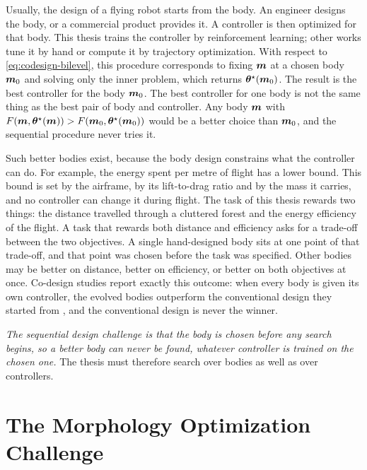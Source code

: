 Usually, the design of a flying robot starts from the body. An engineer designs the body, or a commercial product provides it. A controller is then optimized for that body. This thesis trains the controller by reinforcement learning; other works tune it by hand or compute it by trajectory optimization. With respect to \eqref{eq:codesign-bilevel}, this procedure corresponds to fixing $\bm{m}$ at a chosen body $\bm{m}_0$ and solving only the inner problem, which returns $\bm{\theta}^{\star}(\bm{m}_0)$. The result is the best controller for the body $\bm{m}_0$. The best controller for one body is not the same thing as the best pair of body and controller. Any body $\bm{m}$ with $F(\bm{m}, \bm{\theta}^{\star}(\bm{m})) > F(\bm{m}_0, \bm{\theta}^{\star}(\bm{m}_0))$ would be a better choice than $\bm{m}_0$, and the sequential procedure never tries it.

Such better bodies exist, because the body design constrains what the controller can do. For example, the energy spent per metre of flight has a lower bound. This bound is set by the airframe, by its lift-to-drag ratio and by the mass it carries, and no controller can change it during flight. The task of this thesis rewards two things: the distance travelled through a cluttered forest and the energy efficiency of the flight. A task that rewards both distance and efficiency asks for a trade-off between the two objectives. A single hand-designed body sits at one point of that trade-off, and that point was chosen before the task was specified. Other bodies may be better on distance, better on efficiency, or better on both objectives at once. Co-design studies report exactly this outcome: when every body is given its own controller, the evolved bodies outperform the conventional design they started from \cite{gupta2021embodied, muff2026hexacopters, bergonti2024codesign}, and the conventional design is never the winner.

\emph{The sequential design challenge is that the body is chosen before any search begins, so a better body can never be found, whatever controller is trained on the chosen one.} The thesis must therefore search over bodies as well as over controllers.

\section{The Morphology Optimization Challenge}
\label{sec:challenge-morphology}

